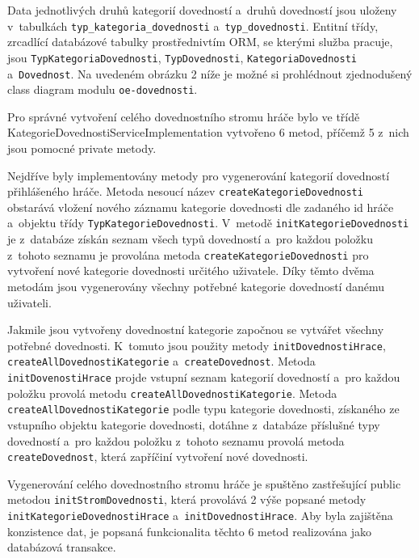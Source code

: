 \documentclass[12pt]{article}
\begin{document}
{Data jednotlivých druhů kategorií dovedností a~druhů dovedností jsou
uloženy v~tabulkách \texttt{typ\_kategoria\_dovednosti} a~\texttt{typ\_dovednosti}.
Entitní třídy, zrcadlící databázové tabulky prostřednivtím ORM, se kterými služba pracuje,
jsou \texttt{TypKategoriaDovednosti}, \texttt{TypDovednosti}, \texttt{KategoriaDovednosti} a~\texttt{Dovednost}.
Na uvedeném obrázku 2 níže je možné si prohlédnout zjednodušený class diagram modulu \texttt{oe-dovednosti}.

\clearpage

\obrazek
{}

Pro správné vytvoření celého dovednostního stromu hráče bylo ve třídě KategorieDovednostiServiceImplementation vytvořeno 6 metod,
příčemž 5 z~nich jsou pomocné private metody.

Nejdříve byly implementovány metody pro vygenerování kategorií dovedností přihlášeného hráče.
Metoda nesoucí název \texttt{createKategorieDovednosti} obstarává vložení nového záznamu kategorie dovednosti dle zadaného id hráče a~objektu třídy
\texttt{TypKategorieDovednosti}.
V~metodě \texttt{initKategorieDovednosti} je z~databáze získán seznam všech typů dovedností
a~pro každou položku z~tohoto seznamu je provolána metoda \texttt{createKategorieDovednosti} pro vytvoření nové kategorie dovednosti určitého uživatele.
Díky těmto dvěma metodám jsou vygenerovány všechny potřebné kategorie dovedností danému uživateli.

Jakmile jsou vytvořeny dovednostní kategorie započnou se vytvářet všechny potřebné dovednosti.
K~tomuto jsou použity metody \texttt{initDovednostiHrace}, \texttt{createAllDovednostiKategorie} a~\texttt{createDovednost}.
Metoda \texttt{initDovenostiHrace} projde vstupní seznam kategorií dovedností
a~pro každou položku provolá metodu \texttt{createAllDovednostiKategorie}.
Metoda \texttt{createAllDovednostiKategorie}  podle typu kategorie dovednosti,
získaného ze vstupního objektu kategorie dovednosti,
dotáhne z~databáze příslušné typy dovedností a~pro každou položku z~tohoto seznamu provolá metoda \texttt{createDovednost},
která zapříčiní vytvoření nové dovednosti.

Vygenerování celého dovednostního stromu hráče je spuštěno zastřešující public metodou \texttt{initStromDovednosti},
která provolává 2 výše popsané metody \texttt{initKategorieDovednostiHrace} a~\texttt{initDovednostiHrace}.
Aby byla zajištěna konzistence dat, je popsaná funkcionalita těchto 6 metod realizována jako databázová transakce.

}
\end{document}
